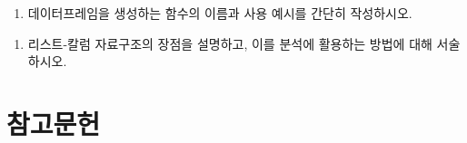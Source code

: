 \documentclass[
  letterpaper,
]{book}
\providecommand{\tightlist}{%
  \setlength{\itemsep}{0pt}\setlength{\parskip}{0pt}}\usepackage{longtable,booktabs,array}
\begin{document}
\begin{enumerate}
\def\labelenumi{\arabic{enumi}.}
\setcounter{enumi}{3}
\tightlist
\item
  데이터프레임을 생성하는 함수의 이름과 사용 예시를 간단히 작성하시오.
\end{enumerate}

\begin{enumerate}
\def\labelenumi{\arabic{enumi}.}
\setcounter{enumi}{4}
\tightlist
\item
  리스트-칼럼 자료구조의 장점을 설명하고, 이를 분석에 활용하는 방법에
  대해 서술하시오.
\end{enumerate}


\chapter*{참고문헌}\label{uxcc38uxace0uxbb38uxd5cc}


\printbibliography[heading=none]


\backmatter


\printindex
\end{document}
